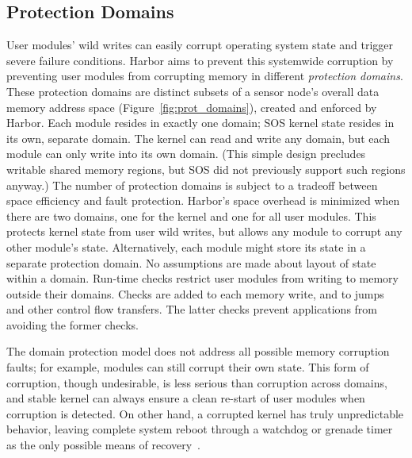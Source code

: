\subsection{Protection Domains}
% 
User modules' wild writes can easily corrupt operating system state
and trigger severe failure conditions.
% 
Harbor aims to prevent this systemwide corruption by
% 
preventing user modules
from corrupting memory in different \emph{protection domains}.
% 
% 
These protection domains are
% 
distinct subsets of a sensor node's overall data memory address space
(Figure~\ref{fig:prot_domains}), created and enforced by Harbor.
% 
Each module resides in exactly one domain; SOS kernel state resides in
its own, separate domain.
% 
The kernel can read and write any domain, but each module can only write
into its own domain.
% 
(This simple design precludes writable shared memory regions, but SOS did
not previously support such regions anyway.)
% 
The number of protection domains is subject to a tradeoff between space
efficiency and fault protection.
%
Harbor's space overhead is minimized when there are two domains, one
for the kernel and one for all user modules.
%
This protects kernel state from user wild writes, but allows any
module to corrupt any other module's state.
%
Alternatively, each module might store its state in a separate
protection domain.
% 
No assumptions are made about layout of state within a domain.
% 
Run-time checks restrict user modules from writing to memory outside
their domains.
% 
Checks are added to each memory write, and to jumps and other control
flow transfers.  
%
The latter checks prevent applications from avoiding the former
checks.


The domain protection model does not address all possible memory corruption
faults; for example,
% 
modules can still corrupt their own state.
% 
This form of corruption, though undesirable, is less serious than
corruption across domains, and stable kernel can always ensure a clean
re-start of user modules when corruption is detected.
% 
On other hand, a corrupted kernel has truly unpredictable behavior,
leaving complete system reboot through a watchdog or grenade timer as
the only possible means of recovery~\cite{dutta05ipsn}.
%
% 

